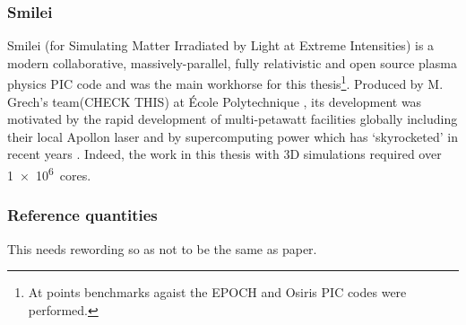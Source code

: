 \subsubsection{Smilei}
Smilei (for Simulating Matter Irradiated by Light at Extreme Intensities) is a modern collaborative, massively-parallel, fully relativistic and open source plasma physics PIC code and was the main workhorse for this thesis\footnote{At points benchmarks agaist the EPOCH and Osiris PIC codes were performed.}. Produced by M. Grech's team(CHECK THIS) at École Polytechnique \cite{derouillatSmileiCollaborativeOpensource2018}, its development was motivated by the rapid development of multi-petawatt facilities globally including their local Apollon laser and by supercomputing power which has `skyrocketed' in recent years \cite{derouillatSmileiCollaborativeOpensource2018}. Indeed, the work in this thesis with 3D simulations required over \qty{1e6}{cores}.


\subsubsection{Reference quantities}
This needs rewording so as not to be the same as paper.


